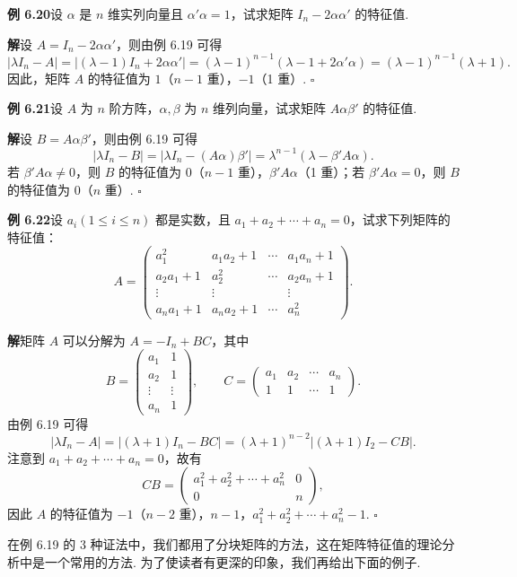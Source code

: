 \documentclass[UTF8,12pt,a4paper,fontset=fandol]{ctexart}
\begin{document}
\noindent\textbf{例 6.20}\quad 设 $\alpha$ 是 $n$ 维实列向量且 $\alpha'\alpha=1$，试求矩阵 $I_n-2\alpha\alpha'$ 的特征值.

\noindent\textbf{解}\quad 设 $A=I_n-2\alpha\alpha'$，则由例 6.19 可得
\[
|\lambda I_n-A|=|(\lambda-1)I_n+2\alpha\alpha'|
=(\lambda-1)^{n-1}(\lambda-1+2\alpha'\alpha)
=(\lambda-1)^{n-1}(\lambda+1).
\]
因此，矩阵 $A$ 的特征值为 $1$（$n-1$ 重），$-1$（1 重）. $\square$

\noindent\textbf{例 6.21}\quad 设 $A$ 为 $n$ 阶方阵，$\alpha,\beta$ 为 $n$ 维列向量，试求矩阵 $A\alpha\beta'$ 的特征值.

\noindent\textbf{解}\quad 设 $B=A\alpha\beta'$，则由例 6.19 可得
\[
|\lambda I_n-B|=|\lambda I_n-(A\alpha)\beta'|=\lambda^{n-1}(\lambda-\beta'A\alpha).
\]
若 $\beta'A\alpha\ne 0$，则 $B$ 的特征值为 $0$（$n-1$ 重），$\beta'A\alpha$（1 重）；若 $\beta'A\alpha=0$，则 $B$ 的特征值为 $0$（$n$ 重）. $\square$

\noindent\textbf{例 6.22}\quad 设 $a_i(1\le i\le n)$ 都是实数，且 $a_1+a_2+\cdots+a_n=0$，试求下列矩阵的特征值：
\[
A=\left(\begin{array}{cccc}
a_1^2 & a_1a_2+1 & \cdots & a_1a_n+1\\
a_2a_1+1 & a_2^2 & \cdots & a_2a_n+1\\
\vdots & \vdots & & \vdots\\
a_na_1+1 & a_na_2+1 & \cdots & a_n^2
\end{array}\right).
\]

\noindent\textbf{解}\quad 矩阵 $A$ 可以分解为 $A=-I_n+BC$，其中
\[
B=\left(\begin{array}{cc}
a_1 & 1\\
a_2 & 1\\
\vdots & \vdots\\
a_n & 1
\end{array}\right),\qquad
C=\left(\begin{array}{cccc}
a_1 & a_2 & \cdots & a_n\\
1 & 1 & \cdots & 1
\end{array}\right).
\]
由例 6.19 可得
\[
|\lambda I_n-A|=|(\lambda+1)I_n-BC|
=(\lambda+1)^{n-2}|(\lambda+1)I_2-CB|.
\]
注意到 $a_1+a_2+\cdots+a_n=0$，故有
\[
CB=\left(\begin{array}{cc}
a_1^2+a_2^2+\cdots+a_n^2 & 0\\
0 & n
\end{array}\right),
\]
因此 $A$ 的特征值为 $-1$（$n-2$ 重），$n-1$，$a_1^2+a_2^2+\cdots+a_n^2-1$. $\square$

在例 6.19 的 3 种证法中，我们都用了分块矩阵的方法，这在矩阵特征值的理论分析中是一个常用的方法. 为了使读者有更深的印象，我们再给出下面的例子.
\end{document}
